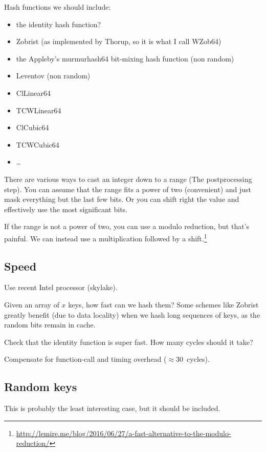 \documentclass{article}
\begin{document}
Hash functions we should include:
\begin{itemize}
\item the identity hash function? 
\item Zobrist (as implemented by Thorup, so it is what I call WZob64)
\item  the Appleby's murmurhash64 bit-mixing hash function (non random)
\item Leventov (non random)
\item ClLinear64
\item TCWLinear64
\item ClCubic64
\item TCWCubic64~\cite{Thorup:2004:TBH:982792.982884}
\item \ldots 
\end{itemize}



There are various ways to cast an integer down to a range (The postprocessing step). You can assume that the range fits a power of two (convenient) and just mask everything but the last few bits. Or you can shift right the value and effectively use the most significant bits.

If the range is not a power of two, you can use a modulo reduction, but that's painful.  We can instead use a multiplication followed by a shift.\footnote{\url{http://lemire.me/blog/2016/06/27/a-fast-alternative-to-the-modulo-reduction/}} 

\subsection{Speed}

Use recent Intel processor (skylake).

Given an array of $x$ keys, how fast can we hash them? Some schemes like Zobrist greatly benefit (due to data locality) when we hash long sequences of keys, as the random bits remain in cache.

Check that the identity function is super fast. How many cycles should it take?

Compensate for function-call and timing overhead ($\approx 30$~cycles).

\subsection{Random keys}

This is probably the least interesting case, but it should be included.
\end{document}
